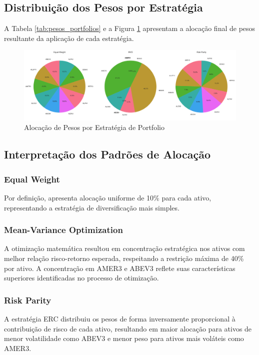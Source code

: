 \subsection{Distribuição dos Pesos por Estratégia}

A Tabela \ref{tab:pesos_portfolios} e a Figura \ref{fig:alocacao_pesos} apresentam a alocação final de pesos resultante da aplicação de cada estratégia.

% 

\begin{figure}[htbp]
\centering
\includegraphics[width=\textwidth]{../results/figures/alocacao_pesos.png}
\caption{Alocação de Pesos por Estratégia de Portfolio}
\label{fig:alocacao_pesos}
\end{figure}

\subsection{Interpretação dos Padrões de Alocação}

\subsubsection{Equal Weight}
Por definição, apresenta alocação uniforme de 10\% para cada ativo, representando a estratégia de diversificação mais simples.

\subsubsection{Mean-Variance Optimization}
A otimização matemática resultou em concentração estratégica nos ativos com melhor relação risco-retorno esperada, respeitando a restrição máxima de 40\% por ativo. A concentração em AMER3 e ABEV3 reflete suas características superiores identificadas no processo de otimização.

\subsubsection{Risk Parity}
A estratégia ERC distribuiu os pesos de forma inversamente proporcional à contribuição de risco de cada ativo, resultando em maior alocação para ativos de menor volatilidade como ABEV3 e menor peso para ativos mais voláteis como AMER3.

